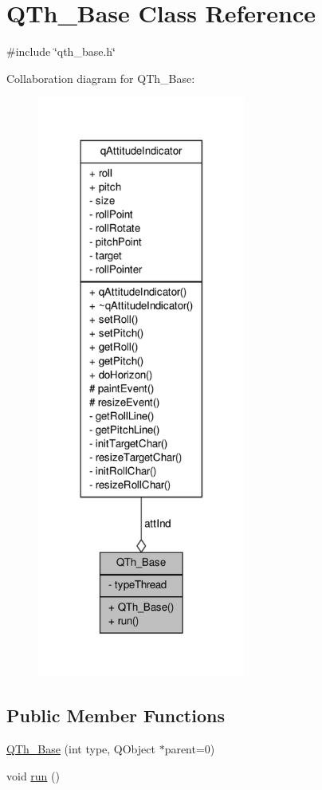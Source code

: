 \hypertarget{classQTh__Base}{\section{Q\-Th\-\_\-\-Base Class Reference}
\label{classQTh__Base}
}


{\ttfamily \#include \char`\"{}qth\-\_\-base.\-h\char`\"{}}



Collaboration diagram for Q\-Th\-\_\-\-Base\-:\nopagebreak
\begin{figure}[H]
\begin{center}
\leavevmode
\includegraphics[width=194pt]{classQTh__Base__coll__graph}
\end{center}
\end{figure}
\subsection*{Public Member Functions}
\begin{DoxyCompactItemize}
\item 
\hyperlink{classQTh__Base_a74f0d7d927529f648cb8f5d29059c786}{Q\-Th\-\_\-\-Base} (int type, Q\-Object $\ast$parent=0)
\item 
void \hyperlink{classQTh__Base_a391a2d2c1b79448577333036eb7bc591}{run} ()
\end{DoxyCompactItemize}
